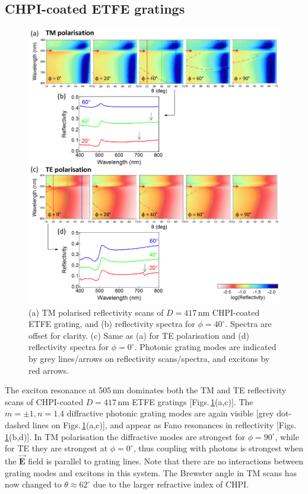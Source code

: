 \subsection{CHPI-coated ETFE gratings}
\begin{figure}[h!p] 
\centering    
\includegraphics[width=\textwidth]{Fig3}
\caption[Reflectivity measurements of $D=417$\,nm CHPI-coated ETFE grating in (a,b) TM and (c,d) TE polarisation.]{(a) TM polarised reflectivity scans of $D=417$\,nm CHPI-coated ETFE grating, and (b) reflectivity spectra for $\phi=40^{\circ}$. Spectra are offset for clarity. (c) Same as (a) for TE polarisation and (d) reflectivity spectra for $\phi=0^{\circ}$. Photonic grating modes are indicated by grey lines/arrows on reflectivity scans/spectra, and excitons by red arrows.}
\label{7Fig3}
\end{figure}
The exciton resonance at 505\,nm dominates both the TM and TE reflectivity scans of CHPI-coated $D=417$\,nm ETFE gratings [Figs.\,\ref{7Fig3}(a,c)]. The $m=\pm1, n=1.4$ diffractive photonic grating modes are again visible [grey dot-dashed lines on Figs.\,\ref{7Fig3}(a,c)], and appear as Fano resonances in reflectivity [Figs.\,\ref{7Fig3}(b,d)]. In TM polarisation the diffractive modes are strongest for $\phi=90^{\circ}$, while for TE they are strongest at $\phi=0^{\circ}$, thus coupling with photons is strongest when the $\vec{\mathbf{E}}$ field is parallel to grating lines. Note that there are no interactions between grating modes and excitons in this system. The Brewster angle in TM scans has now changed to $\theta\approx62^{\circ}$ due to the larger refractive index of CHPI.


